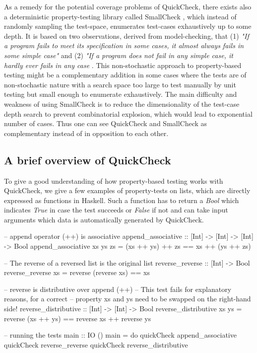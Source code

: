 \medskip

As a remedy for the potential coverage problems of QuickCheck, there exists also a deterministic property-testing library called SmallCheck \cite{runciman_smallcheck_2008}, which instead of randomly sampling the test-space, enumerates test-cases exhaustively up to some depth. It is based on two observations, derived from model-checking, that (1) \textit{"If a program fails to meet its specification in some cases, it almost always fails in some simple case"} and (2) \textit{"If a program does not fail in any simple case, it hardly ever fails in any case} \cite{runciman_smallcheck_2008}. This non-stochastic approach to property-based testing might be a complementary addition in some cases where the tests are of non-stochastic nature with a search space too large to test manually by unit testing but small enough to enumerate exhaustively. The main difficulty and weakness of using SmallCheck is to reduce the dimensionality of the test-case depth search to prevent combinatorial explosion, which would lead to exponential number of cases. Thus one can see QuickCheck and SmallCheck as complementary instead of in opposition to each other.

\subsection*{A brief overview of QuickCheck}
To give a good understanding of how property-based testing works with QuickCheck, we give a few examples of property-tests on lists, which are directly expressed as functions in Haskell. Such a function has to return a \textit{Bool} which indicates \textit{True} in case the test succeeds or \textit{False} if not and can take input arguments which data is automatically generated by QuickCheck.

\begin{HaskellCode}
-- append operator (++) is associative
append_associative :: [Int] -> [Int] -> [Int] -> Bool
append_associative xs ys zs = (xs ++ ys) ++ zs == xs ++ (ys ++ zs)

-- The reverse of a reversed list is the original list
reverse_reverse :: [Int] -> Bool
reverse_reverse xs = reverse (reverse xs) == xs

-- reverse is distributive over append (++)
-- This test fails for explanatory reasons, for a correct 
-- property xs and ys need to be swapped on the right-hand side!
reverse_distributive :: [Int] -> [Int] -> Bool
reverse_distributive xs ys = reverse (xs ++ ys) == reverse xs ++ reverse ys

-- running the tests
main :: IO ()
main = do
  quickCheck append_associative
  quickCheck reverse_reverse
  quickCheck reverse_distributive
\end{HaskellCode}

